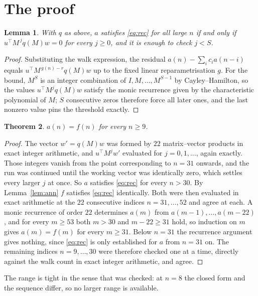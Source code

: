 \documentclass[11pt,a4paper]{article}
\theoremstyle{plain}
\newtheorem{theorem}{Theorem}
\newtheorem{lemma}[theorem]{Lemma}
\theoremstyle{definition}
\begin{document}
\section{The proof}

\begin{lemma}\label{lem:crit}
With $q$ as above, $a$ satisfies \eqref{eq:rec} for all large $n$ if and only if
$u^{\!\top}M^{\,j}q(M)w=0$ for every $j\ge0$, and it is enough to check $j<S$.
\end{lemma}

\begin{proof}
Substituting the walk expression, the residual $a(n)-\sum_ic_ia(n-i)$ equals
$u^{\!\top}M^{\,g(n)-r}q(M)w$ up to the fixed linear reparametrisation $g$. For the bound,
$M^{S}$ is an integer combination of $I,M,\dots,M^{S-1}$ by Cayley--Hamilton, so the values
$u^{\!\top}M^{j}q(M)w$ satisfy the monic recurrence given by the characteristic polynomial of
$M$; $S$ consecutive zeros therefore force all later ones, and the last nonzero value pins the
threshold exactly.
\end{proof}

\begin{theorem}
$a(n)=f(n)$ for every $n\ge9$.
\end{theorem}

\begin{proof}
The vector $w'=q(M)w$ was formed by $22$ matrix--vector products in exact integer
arithmetic, and $u^{\!\top}M^{j}w'$ evaluated for $j=0,1,\dots$, again exactly. Those integers
vanish from the point corresponding to $n=31$ onwards, and the run was continued until the
working vector was identically zero, which settles every larger $j$ at once. So $a$ satisfies
\eqref{eq:rec} for every $n>30$. By Lemma~\ref{lem:ann} $f$ satisfies \eqref{eq:rec}
identically. Both were then evaluated in exact arithmetic at the $22$ consecutive indices
$n=31,\dots,52$ and agree at each. A monic recurrence of order $22$
determines $a(m)$ from $a(m-1),\dots,a(m-22)$, and for every $m\ge53$ both
$m>30$ and $m-22\ge31$ hold, so induction on $m$ gives $a(m)=f(m)$ for every
$m\ge31$.
Below $n=31$ the recurrence argument gives nothing, since \eqref{eq:rec} is only
established for $a$ from $n=31$ on. The remaining indices $n=9,\dots,30$ were
therefore checked one at a time, directly against the walk count in exact integer arithmetic,
and agree.
\end{proof}

The range is tight in the sense that was checked: at $n=8$ the closed form and the sequence differ, so no larger range is available.
\end{document}
